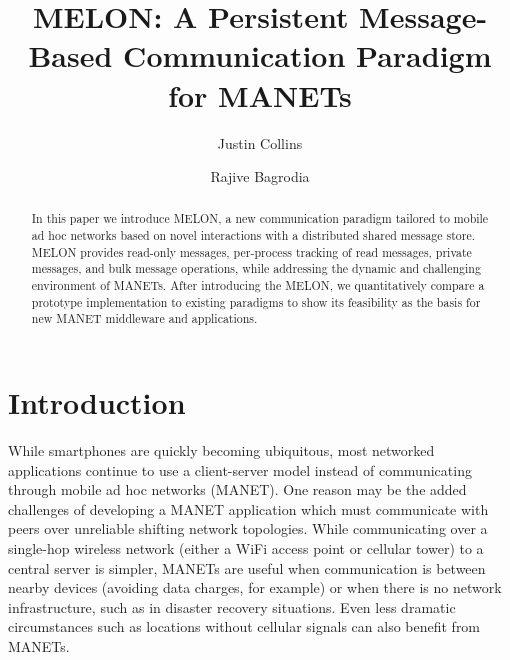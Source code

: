 \documentclass[lnicst]{svmultln}
\begin{document}
\mainmatter  %

\title{MELON: A Persistent Message-Based Communication Paradigm for MANETs}


\author{Justin Collins\and Rajive Bagrodia}




\maketitle
\begin{abstract}
In this paper we introduce MELON, a new communication paradigm tailored to mobile ad hoc networks based on novel interactions with a distributed shared message store. MELON provides read-only messages, per-process tracking of read messages, private messages, and bulk message operations, while addressing the dynamic and challenging environment of MANETs. After introducing the MELON, we quantitatively compare a prototype implementation to existing paradigms to show its feasibility as the basis for new MANET middleware and applications.
\end{abstract}

\section{Introduction}

While smartphones are quickly becoming ubiquitous, most networked applications continue to use a client-server model instead of communicating through mobile ad hoc networks (MANET). One reason may be the added challenges of developing a MANET application which must communicate with peers over unreliable shifting network topologies. While communicating over a single-hop wireless network (either a WiFi access point or cellular tower) to a central server is simpler, MANETs are useful when communication is between nearby devices (avoiding data charges, for example) or when there is no network infrastructure, such as in disaster recovery situations. Even less dramatic circumstances such as locations without cellular signals can also benefit from MANETs.
\end{document}
